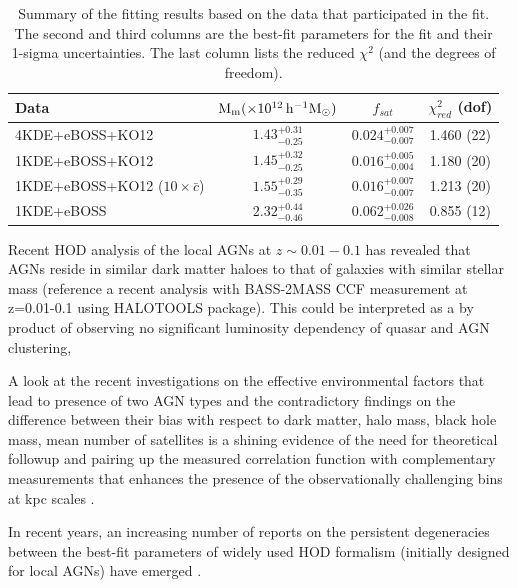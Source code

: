 \documentclass[useAMS,usenatbib]{mn2e}
\begin{document}
\begin{table}
\centering
\begin{tabular}{lccc}

\hline
\hline
Data &$\rm M_m (\times 10^{12}\, h^{-1} M_{\odot})$ &$f_{sat}$& $\chi_{red}^2$ (dof)\\
\hline
 \vspace{.1in}
 4KDE+eBOSS+KO12& $1.43_{-0.25}^{+0.31}$& $0.024_{-0.007}^{+0.007}$& 1.460 (22)\\
 \vspace{.1in}
 1KDE+eBOSS+KO12& $1.45_{-0.25}^{+0.32}$& $0.016_{-0.004}^{+0.005}$& 1.180 (20)\\
 \vspace{.1in}
 1KDE+eBOSS+KO12 ($10\times \bar c$)& $1.55_{-0.35}^{+0.29}$& $0.016_{-0.007}^{+0.007}$& 1.213 (20)\\
 \vspace{.1in}
 1KDE+eBOSS & $2.32_{-0.46}^{+0.44}$& $0.062_{-0.008}^{+0.026}$& 0.855 (12)\\

\hline
\end{tabular}
\caption{ Summary of the fitting results based on the data that participated in 
the fit. The second and third columns are the best-fit parameters for the 
fit and their 1-sigma uncertainties. The last column lists the reduced 
$\chi^2$ (and the degrees of freedom). }\label{tab:res}
\end{table}

Recent HOD analysis of the local AGNs at $z \sim 0.01-0.1$ has revealed that 
AGNs reside in similar dark matter haloes to that of galaxies with similar 
stellar mass (reference a recent analysis with BASS-2MASS CCF measurement at 
z=0.01-0.1 using HALOTOOLS package). 
This could be interpreted as a by product of observing no significant luminosity 
dependency of quasar and AGN clustering,  

A look at the recent investigations on the effective environmental factors that 
lead to presence of two AGN types and the contradictory findings on the 
difference between their bias with respect to dark matter, halo mass, black hole 
mass, mean number of satellites \citep[see, e.g.,][]{Dip14CMB,Dip17a,kr18} is a 
shining evidence of the need for theoretical followup and pairing up the 
measured correlation function with complementary measurements that enhances the 
presence of the observationally challenging bins at kpc scales \citep[see, ][for 
a proposed alternative]{sta11}. 

In recent years, an increasing number of reports on the persistent degeneracies 
between the best-fit parameters of widely used HOD formalism (initially 
designed for local AGNs) have emerged \citep{Coi16,coi17}. 
\end{document}
